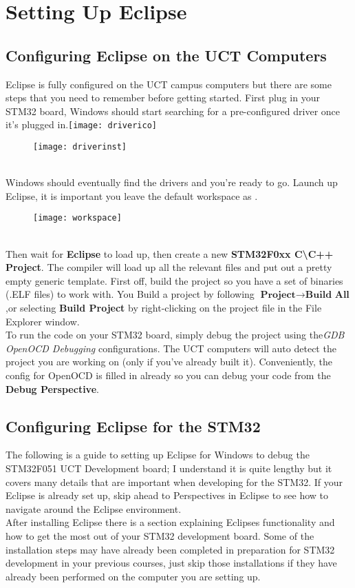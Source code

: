 \chapter{Setting Up Eclipse}
\label{ch:Eclipse}

\section{Configuring Eclipse on the UCT Computers}
\label{sec:EclipseConfig}
Eclipse is fully configured on the UCT campus computers but there are some steps that you need to remember before getting started. First plug in your STM32 board, Windows should start searching for a pre-configured driver once it's plugged in.\texttt{[image: driverico]}\\
\begin{figure}[htbp]
\centering
\texttt{[image: driverinst]}
\end{figure}
\\
Windows should eventually find the drivers and you're ready to go. Launch up Eclipse, it is important you leave the default workspace as \textbf{\color{Aquamarine}{C\textbackslash :Workspace}}.
\begin{figure}[htbp]
\centering
\texttt{[image: workspace]}
\end{figure}
\\
Then wait for \textbf{Eclipse} to load up, then create a new \textbf{\color{Green}STM32F0xx C\textbackslash C++ Project}. The compiler will load up all the relevant files and put out a pretty empty generic template. First off, build the project so you have a set of binaries (.ELF files) to work with. You Build a project by following $\textbf{Project}\rightarrow \textbf{Build All}$ ,or selecting \textbf{Build Project} by right-clicking on the project file in the File Explorer window.
\\
To run the code on your STM32 board, simply debug the project using the\textit{GDB OpenOCD Debugging} configurations. The UCT computers will auto detect the project you are working on (only if you've already built it). Conveniently, the config for OpenOCD is filled in already so you can debug your code from the \textbf{\color{Purple}Debug Perspective}.
\section{Configuring Eclipse for the STM32}
\label{sec:eclipseconfig}
The following is a guide to setting up Eclipse for Windows to debug the STM32F051 UCT Development board; I understand it is quite lengthy but it covers many details that are important when developing for the STM32. If your Eclipse is already set up, skip ahead to Perspectives in Eclipse \cite{sec:perpectives} to see how to navigate around the Eclipse environment.
\\
After installing Eclipse there is a section explaining Eclipses functionality and how to get the most out of your STM32 development board. Some of the installation steps may have already been completed in preparation for STM32 development in your previous courses, just skip those installations if they have already been performed on the computer you are setting up.
